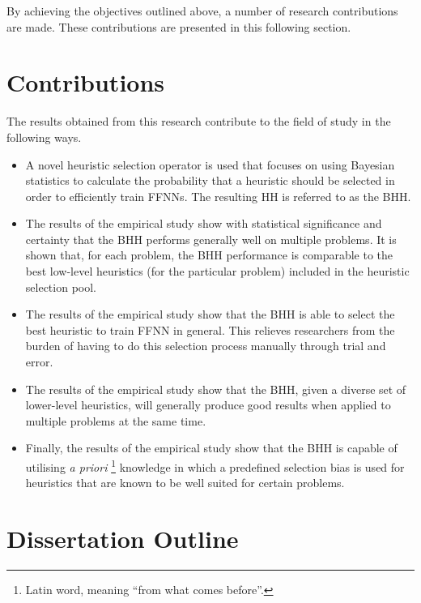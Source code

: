 \noindent
By achieving the objectives outlined above, a number of research contributions are made. These contributions are presented in this following section.


\section{Contributions}\label{sec:introduction:contributions}

The results obtained from this research contribute to the field of study in the
following ways.

\begin{itemize}
      \item A novel heuristic selection operator is used that focuses on using Bayesian statistics to calculate the probability that a heuristic should be selected in order to efficiently train \acp{FFNN}. The resulting \ac{HH} is referred to as the \acf{BHH}.

      \item The results of the empirical study show with statistical significance and certainty that the \Ac{BHH} performs generally well on multiple problems. It is shown that, for each problem, the \Ac{BHH} performance is comparable to the best low-level heuristics (for the particular problem) included in the heuristic selection pool.

      \item The results of the empirical study show that the \Ac{BHH} is able to select the best heuristic to train \ac{FFNN} in general. This relieves researchers from the burden of having to do this selection process manually through trial and error.

      \item The results of the empirical study show that the \Ac{BHH}, given a diverse set of lower-level heuristics, will generally produce good results when applied to multiple problems at the same time.

      \item Finally, the results of the empirical study show that the \Ac{BHH} is capable of utilising \textit{a priori} \footnote{Latin word, meaning ``from what comes before''.} knowledge in which a predefined selection bias is used for heuristics that are known to be well suited for certain problems.
\end{itemize}


\section{Dissertation Outline}\label{sec:introduction:outline}

